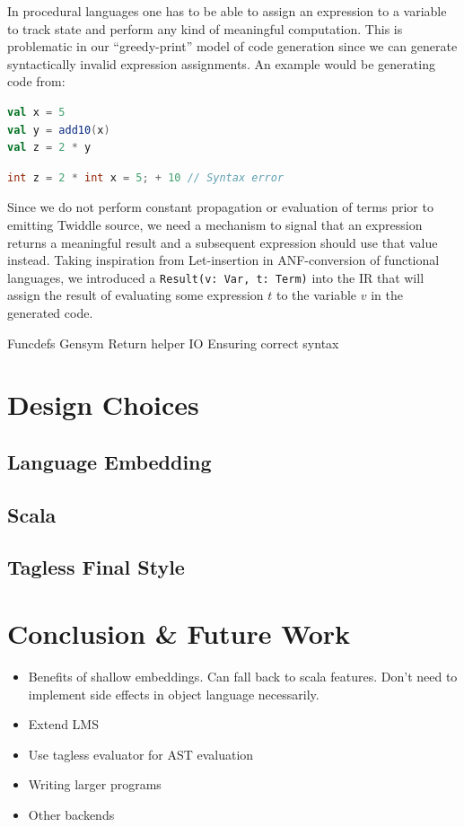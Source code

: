 \documentclass{article}
\begin{document}
In procedural languages one has to be able to assign an expression to a variable to track state and perform any kind of meaningful computation. This is problematic in our ``greedy-print'' model of code generation since we can generate syntactically invalid expression assignments. An example would be generating code from:
\begin{lstlisting}[language=Scala]
val x = 5
val y = add10(x)
val z = 2 * y
\end{lstlisting}
\begin{lstlisting}[language=C]
int z = 2 * int x = 5; + 10 // Syntax error
\end{lstlisting} Since we do not perform constant propagation or evaluation of terms prior to emitting Twiddle source, we need a mechanism to signal that an expression returns a meaningful result and a subsequent expression should use that value instead. Taking inspiration from Let-insertion in ANF-conversion of functional languages, we introduced a \texttt{Result(v: Var, t: Term)} into the IR that will assign the result of evaluating some expression $t$ to the variable $v$ in the generated code.

Funcdefs
Gensym
Return helper
IO
Ensuring correct syntax
\section{Design Choices}
\subsection{Language Embedding}
\subsection{Scala}
\subsection{Tagless Final Style}\label{subsec:tagless}
\section{Conclusion \& Future Work}
\begin{itemize}
	\item Benefits of shallow embeddings. Can fall back to scala features. Don't need to implement side effects in object language necessarily.
	\item Extend LMS
	\item Use tagless evaluator for AST evaluation
	\item Writing larger programs
	\item Other backends
\end{itemize}



\end{document}
